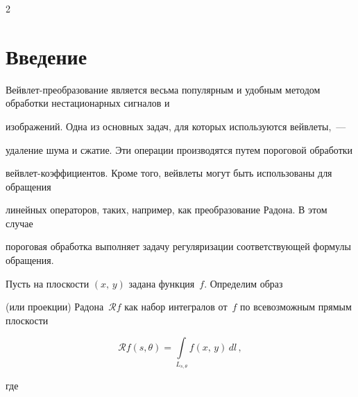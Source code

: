 




      \thispagestyle{headings}





      \begin{multicols}{2}





      \label{st\stat}








\section{Введение}





Вейвлет-преобразование является весьма популярным и удобным методом обработки нестационарных сигналов и 


изображений. Одна из основных задач, для которых используются вейв\-ле\-ты,~---


удаление шума и сжатие. Эти операции производятся путем пороговой обработки 


вейв\-лет-коэффициентов. Кроме того, вейвлеты могут быть использованы для обращения 


линейных операторов, таких, например, как преобразование Радона. В этом случае 


пороговая обработка выполняет задачу регуляризации соответствующей формулы обращения.





Пусть на плоскости $(x,\,y)$ задана функция~$f$. Определим образ 


(или проекции) Радона~$\mathcal{R}f$ как набор интегралов от~$f$ по всевозможным прямым плоскости


\begin{equation}


\label{eq_radonTransform}


\mathcal{R}f(s,\theta)=\int\limits_{L_{s,\theta}}f\left(x,\,y\right)\,dl\,,


\end{equation}


где


\begin{equation*}



\end{equation*}
\end{multicols}

